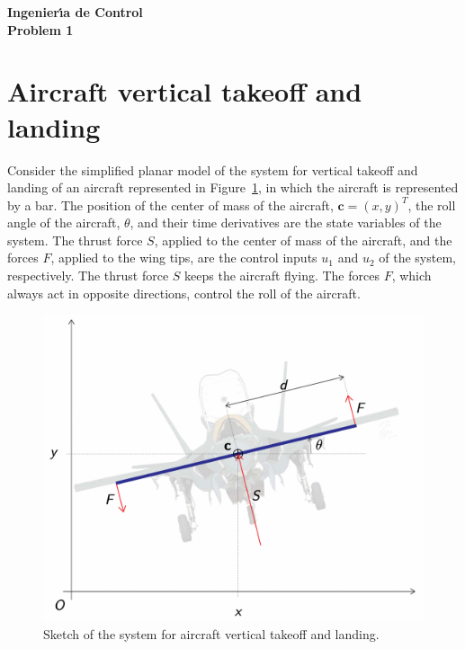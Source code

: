 \documentclass{article}
\begin{document}
\begin{center}
\bf{\huge 
Ingenier\'{\i}a de Control\\
\vspace{0.25cm}
Problem 1
}
\end{center}

\section*{Aircraft vertical takeoff and landing}

Consider the simplified planar model of the system for vertical takeoff and landing of an aircraft represented in Figure~\ref{fig:figure_1}, in which the aircraft is represented by a bar. 
The position of the center of mass of the aircraft, $\mathbf{c} =  (x, y)^T$, the roll angle of the aircraft, $\theta$, and their time derivatives are the state variables of the system.  
The thrust force $S$, applied to the center of mass of the aircraft, and the forces $F$, applied to the wing tips, are the control inputs $u_1$ and $u_2$ of the system, respectively.
The thrust force $S$ keeps the aircraft flying.
The forces $F$, which always act in opposite directions, control the roll of the aircraft.  



\begin{figure}[H]
\centerline{\includegraphics[width=0.75\columnwidth]{drawing}}
\caption{Sketch of the system for aircraft vertical takeoff and landing.}
\label{fig:figure_1}
\end{figure}
\end{document}
